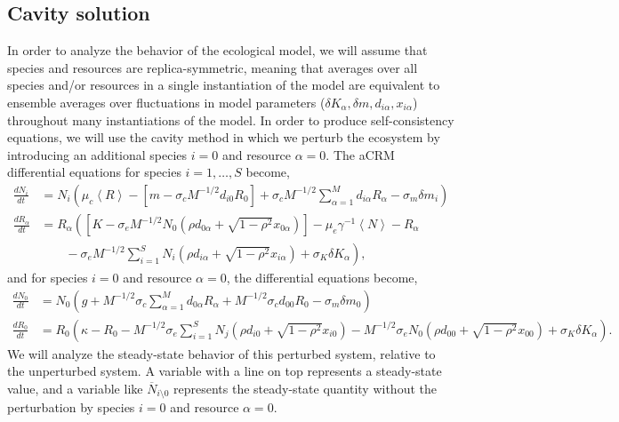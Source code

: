 \documentclass[10pt]{article}
\newcommand{\eval}[1]{\left\langle #1 \right\rangle}
\begin{document}
\subsection{Cavity solution}

In order to analyze the behavior of the ecological model, we will assume that species and resources are replica-symmetric, meaning that averages over all species and/or resources in a single instantiation of the model are equivalent to ensemble averages over fluctuations in model parameters ($\delta K_\alpha, \delta m, d_{i\alpha}, x_{i\alpha}$) throughout many instantiations of the model.
In order to produce self-consistency equations, we will use the cavity method in which we perturb the ecosystem by introducing an additional species $i = 0$ and resource $\alpha = 0$.
The aCRM differential equations for species $i = 1,\dots,S$ become,
\begin{align}
	\frac{dN_i}{dt}
	&=
	N_i
	\left(
		\mu_c \eval{R} -
		[m - \sigma_c M^{-1/2} d_{i0}R_0]
		+
		\sigma_c M^{-1/2} \sum_{\alpha=1}^M d_{i\alpha} R_\alpha
		-
		\sigma_m
		\delta m_i
	\right)
	\label{aCRM-N-pert}
	\\
	\frac{dR_\alpha}{dt}
	&=
	R_\alpha
	\left(
		\left[
			K 
			-
			\sigma_e M^{-1/2} N_0 \left(\rho d_{0\alpha} + \sqrt{1-\rho^2} x_{0\alpha}\right)
		\right]
		-
		\mu_e \gamma^{-1}\eval{N}
		-
		R_\alpha
	\right.
	\nonumber
		\\
		&
	\left.
		\qquad-
		\sigma_e M^{-1/2}
		\sum_{i=1}^{S}
		N_i
		\left(
			\rho d_{i\alpha}
			+
			\sqrt{1-\rho^2} x_{i\alpha}
		\right)
		+
		\sigma_K \delta K_\alpha
	\right),
	\label{aCRM-R-pert}
\end{align}
and for species $i = 0$ and resource $\alpha = 0$, the differential equations become,
\begin{align}
	\frac{dN_0}{dt}
	&=
	N_0
	\left(
		g
		+
		M^{-1/2}\sigma_c 
		\sum_{\alpha=1}^M
		d_{0\alpha} R_\alpha
		+
		M^{-1/2}\sigma_c
		d_{00}R_0
		-
		\sigma_m 
		\delta m_0
	\right)
	\\
	\frac{dR_0}{dt}
	&=
	R_0
	\left(
		\kappa
		-
		R_0
		-
		M^{-1/2}\sigma_e
		\sum_{i=1}^{S}
		N_j \left(
			\rho d_{i0}
			+
			\sqrt{1-\rho^2}x_{i0}
		\right)
		-
		M^{-1/2}
		\sigma_e
		N_0
		\left(
			\rho d_{00}
			+
			\sqrt{1-\rho^2}x_{00}
		\right)
		+
		\sigma_K
		\delta K_\alpha
	\right).
\end{align}
We will analyze the steady-state behavior of this perturbed system, relative to the unperturbed system.
A variable with a line on top represents a steady-state value, and a variable like $\overline N_{i \setminus 0}$ represents the steady-state quantity without the perturbation by species $i=0$ and resource $\alpha = 0$.
\end{document}
